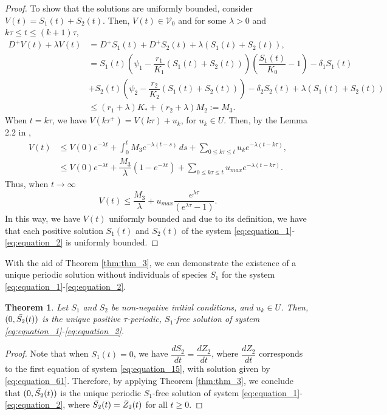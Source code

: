 \documentclass[10pt,letterpaper]{article}
\newtheorem{theorem}{Theorem}
\begin{document}
\begin{proof}
To show that the solutions are uniformly bounded, consider $V(t) = S_1(t)+S_2(t)$. Then, $V(t) \in \mathcal{V}_0$ and for some $\lambda >0$ and $k\tau \leq t \leq (k+1)\tau$,
\begin{align}\label{eq:equation_21}\nonumber
    D^+V(t)+\lambda V(t) &= D^+S_1(t)+D^+S_2(t) + \lambda(S_1(t)+S_2(t)),\\\nonumber
    &= S_1(t)\left(\psi_1-\dfrac{r_1}{K_1}(S_1(t)+S_2(t))\right) \left(\dfrac{S_1(t)}{K_0} - 1 \right) - \delta_1 S_1(t)\\\nonumber &+ S_2(t)\left(\psi_2-\dfrac{r_2}{K_2}(S_1(t)+S_2(t))\right) - \delta_2 S_2(t) + \lambda(S_1(t)+S_2(t))\\
    & \leq (r_1 +\lambda)K_*+(r_2 +\lambda)M_2 := M_3.
\end{align}
When $t = k\tau$, we have $V(k\tau^+) = V(k\tau)+u_k$, for $u_k \in U$. Then, by the Lemma 2.2 in \cite{Bainov1993},
\begin{align}\label{eq:equation_22}\nonumber
    V(t)&\leq V(0) e^{-\lambda t} +\int_0^t M_3 e^{-\lambda (t-s)}\,ds + \sum_{0 \leq k\tau \leq t} u_k e^{-\lambda(t-k\tau)},\\
    &\leq V(0) e^{-\lambda t} +\dfrac{M_3}{\lambda}(1-e^{-\lambda t})+\sum_{0 \leq k\tau \leq t} u_{max}e^{-\lambda(t-k\tau)}.
\end{align}Thus, when $t \to \infty$
\begin{equation}\label{eq:equation_23}
    V(t) \leq \dfrac{M_3}{\lambda} + u_{max}\dfrac{e^{\lambda \tau}}{(e^{\lambda \tau}-1)}.
\end{equation}
In this way, we have $V(t)$ uniformly bounded and due to its definition, we have that each positive solution $S_1(t)$ and $S_2(t)$ of the system \eqref{eq:equation_1}-\eqref {eq:equation_2} is uniformly bounded.
\end{proof}

With the aid of Theorem \eqref{thm:thm_3}, we can demonstrate the existence of a unique periodic solution without individuals of species $S_1$ for the system \eqref{eq:equation_1}-\eqref{eq:equation_2}.

\begin{theorem}\label{thm:thm_4} Let $S_1$ and $S_2$ be non-negative initial conditions, and $u_k \in U$. Then, $(0, \Bar{S_2}(t))$ is the unique positive $\tau$-periodic, $S_1$-free solution of system \eqref{eq:equation_1}-\eqref{eq:equation_2}.
\end{theorem}

\begin{proof}
  Note that when $S_1(t) = 0$, we have $\dfrac{dS_2}{dt} = \dfrac{dZ_2}{dt}$, where $\dfrac{dZ_2}{dt}$ corresponds to the first equation of system \eqref{eq:equation_15}, with solution given by \eqref{eq:equation_61}. Therefore, by applying Theorem \eqref{thm:thm_3}, we conclude that $(0, \Bar{S_2}(t))$ is the unique periodic $S_1$-free solution of system \eqref{eq:equation_1}-\eqref{eq:equation_2}, where $\Bar{S_2}(t) = \bar{Z}_2(t)$ for all $t \geq 0$.
\end{proof}
\end{document}
